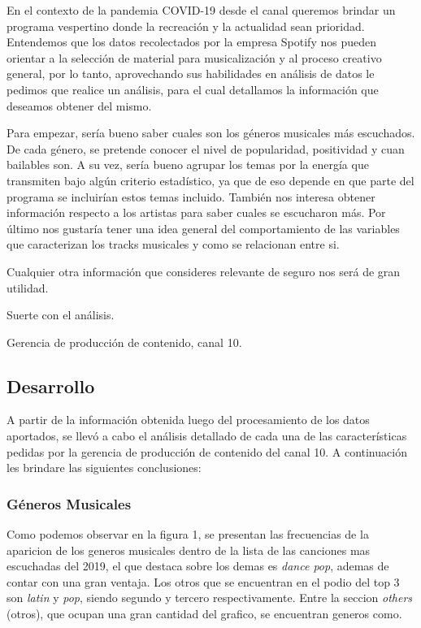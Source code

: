 \documentclass{article}
\begin{document}
En el contexto de la pandemia COVID-19 desde el canal queremos brindar un
programa vespertino donde la recreación y la actualidad sean prioridad.
Entendemos que los datos recolectados por la empresa Spotify nos pueden orientar
a la selección de material para musicalización y al proceso creativo general,
por lo tanto, aprovechando sus habilidades en análisis de datos le pedimos que
realice un análisis, para el cual detallamos la información que deseamos obtener
del mismo.  

Para empezar, sería bueno saber cuales son los géneros musicales más escuchados.
De cada género, se pretende conocer el nivel de popularidad, positividad y cuan
bailables son. A su vez, sería bueno agrupar los temas por la energía que
transmiten bajo algún criterio estadístico, ya que de eso depende en que parte
del programa se incluirían estos temas incluido. También nos interesa obtener
información respecto a los artistas para saber cuales se escucharon más. Por
último nos gustaría tener una idea general del comportamiento de las variables
que caracterizan los tracks musicales y como se relacionan entre si.

Cualquier otra información que consideres relevante de seguro nos será de gran utilidad.

Suerte con el análisis.
\begin{flushright}
  Gerencia de producción de contenido, canal 10.
\end{flushright}

\newpage
\subsection{Desarrollo}
A partir de la información obtenida luego del procesamiento de los datos
aportados, se llevó a cabo el análisis detallado de cada una de las
características pedidas por la gerencia de producción de contenido del canal 10.
A continuación les brindare las siguientes conclusiones:

\subsubsection{Géneros Musicales}
Como podemos observar en la figura 1, se presentan las frecuencias de la
aparicion de los generos musicales dentro de la lista de las canciones mas
escuchadas del 2019, el que destaca sobre los demas es \textit{dance pop},
ademas de contar con una gran ventaja. Los otros que se encuentran en el podio
del top 3 son \textit{latin} y \textit{pop}, siendo segundo y tercero
respectivamente. Entre la seccion \textit{others} (otros), que ocupan una gran
cantidad del grafico, se encuentran generos como.
\end{document}
